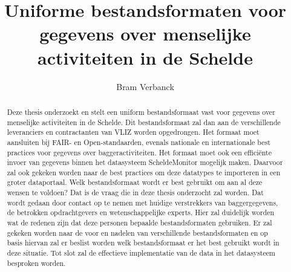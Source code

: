 \documentclass{hogent-article}
\title{Uniforme bestandsformaten voor gegevens over menselijke activiteiten in de Schelde}
\author{Bram Verbanck}
\begin{document}
\begin{abstract}
    Deze thesis onderzoekt en stelt een uniform bestandsformaat vast voor gegevens over menselijke activiteiten in de Schelde. Dit bestandsformaat zal dan aan de verschillende leveranciers en contractanten van VLIZ worden opgedrongen. Het formaat moet aansluiten bij FAIR- en Open-standaarden, evenals nationale en internationale best practices voor gegevens over baggeractiviteiten. Het formaat moet ook een efficiënte invoer van gegevens binnen het datasysteem ScheldeMonitor mogelijk maken. Daarvoor zal ook gekeken worden naar de best practices om deze datatypes te importeren in een groter dataportaal. Welk bestandsformaat wordt er best gebruikt om aan al deze wensen te voldoen? Dat is de vraag die in deze thesis onderzocht zal worden. Dat wordt gedaan door contact op te nemen met huidige verstrekkers van baggergegevens, de betrokken opdrachtgevers en wetenschappelijke experts. Hier zal duidelijk worden wat de redenen zijn dat deze personen bepaalde bestandsformaten gebruiken. Er zal gekeken worden naar de voor en nadelen van verschillende bestandsformaten en op basis hiervan zal er beslist worden welk bestandsformaat er het best gebruikt wordt in deze situatie. Tot slot zal de effectieve implementatie van de data in het datasysteem besproken worden.
\end{abstract}

\tableofcontents



\printbibliography[heading=bibintoc]
\end{document}
